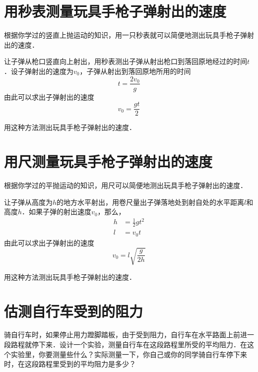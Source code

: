 \section{用秒表测量玩具手枪子弹射出的速度}
根据你学过的竖直上抛运动的知识，用一只秒表就可以简便地测出玩具手枪子弹射出的速度．

让子弹从枪口竖直向上射出，用秒表测出子弹从射出枪口到落回原地经过的时间$t$．设子弹射出的速度为$v_0$，子弹从射出到落回原地所用的时间
\[t=\frac{2v_0}{g}\]
由此可以求出子弹射出的速度
\[v_0=\frac{gt}{2}\]

用这种方法测出玩具手枪子弹射出的速度．

\section{用尺测量玩具手枪子弹射出的速度}
根据你学过的平抛运动的知识，用尺可以简便地测出玩具手枪子弹射出的速度．

让子弹从高度为$h$的地方水平射出，用卷尺量出子弹落地处到射自处的水平距离$l$和高度$h$．如果子弹的射出速度$v_0$，那么，
\[\begin{split}
        h & =\frac{1}{2}gt^2 \\
        l & =v_0t
    \end{split}\]
由此可以求出子弹射出的速度
\[v_0=l \sqrt{\frac{g}{2h}}\]

用这种方法测出玩具手枪子弹射出的速度．

\section{估测自行车受到的阻力}

骑自行车时，如果停止用力蹬脚踏板，由于受到阻力，自行车在水平路面上前进一段路程就停下来．设计一个实验，测量自行车在这段路程里所受的平均阻力．在这个实验里，你要测量些什么？实际测量一下，你自己或你的同学骑自行车停下来时，在这段路程里受到的平均阻力是多少？
\newpage
